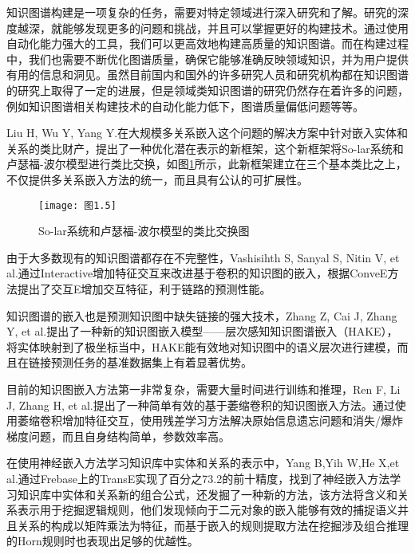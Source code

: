 \documentclass[bachelor_p]{hdu-thesis}
\begin{document}
知识图谱构建是一项复杂的任务，需要对特定领域进行深入研究和了解。研究的深度越深，就能够发现更多的问题和挑战，并且可以掌握更好的构建技术。通过使用自动化能力强大的工具，我们可以更高效地构建高质量的知识图谱。而在构建过程中，我们也需要不断优化图谱质量，确保它能够准确反映领域知识，并为用户提供有用的信息和洞见。虽然目前国内和国外的许多研究人员和研究机构都在知识图谱的研究上取得了一定的进展，但是领域类知识图谱的研究仍然存在着许多的问题，例如知识图谱相关构建技术的自动化能力低下，图谱质量偏低问题等等。


Liu H, Wu Y, Yang Y.在大规模多关系嵌入这个问题的解决方案中针对嵌入实体和关系的类比财产，提出了一种优化潜在表示的新框架\cite{inproceedings18}，这个新框架将So-lar系统和卢瑟福-波尔模型进行类比交换，如图\ref{fig:graph.05}所示，此新框架建立在三个基本类比之上，不仅提供多关系嵌入方法的统一，而且具有公认的可扩展性。

\begin{figure}[h]
  \centering
  \texttt{[image: 图1.5]}
  \caption{So-lar系统和卢瑟福-波尔模型的类比交换图\cite{inproceedings18}} \label{fig:graph.05}
\end{figure}

由于大多数现有的知识图谱都存在不完整性，Vashisihth S, Sanyal S, Nitin V, et al.通过Interactive增加特征交互来改进基于卷积的知识图的嵌入\cite{inproceedings19}，根据ConveE方法提出了交互E增加交互特征，利于链路的预测性能。

知识图谱的嵌入也是预测知识图中缺失链接的强大技术，Zhang Z, Cai J, Zhang Y, et al.提出了一种新的知识图嵌入模型——层次感知知识图谱嵌入（HAKE）\cite{inproceedings20}，将实体映射到了极坐标当中，HAKE能有效地对知识图中的语义层次进行建模，而且在链接预测任务的基准数据集上有着显著优势。

目前的知识图嵌入方法第一非常复杂，需要大量时间进行训练和推理，Ren F, Li J, Zhang H, et al.提出了一种简单有效的基于萎缩卷积的知识图嵌入方法\cite{inproceedings21}。通过使用萎缩卷积增加特征交互，使用残差学习方法解决原始信息遗忘问题和消失/爆炸梯度问题，而且自身结构简单，参数效率高。

在使用神经嵌入方法学习知识库中实体和关系的表示中，Yang B,Yih W,He X,et al.通过Frebase上的TransE\cite{article22}实现了百分之73.2的前十精度，找到了神经嵌入方法学习知识库中实体和关系新的组合公式，还发掘了一种新的方法，该方法将含义和关系表示用于挖掘逻辑规则，他们发现倾向于二元对象的嵌入能够有效的捕捉语义并且关系的构成以矩阵乘法为特征，而基于嵌入的规则提取方法在挖掘涉及组合推理的Horn规则时也表现出足够的优越性。
\end{document}
